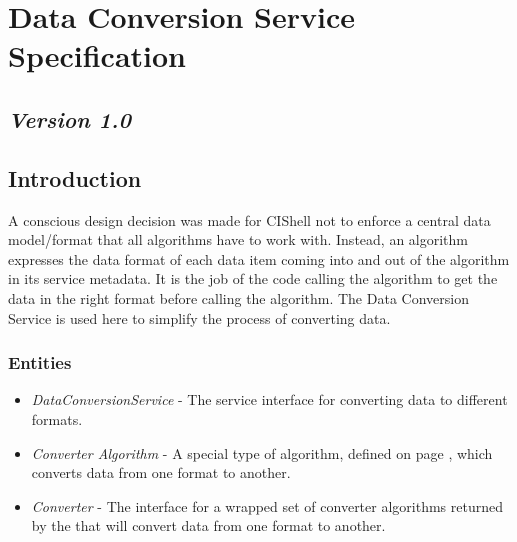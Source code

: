 %

\chapter{Data Conversion Service Specification}
\section*{\textit{Version 1.0}}
\section{Introduction}

A conscious design decision was made for CIShell not to enforce a central data
model/format that all algorithms have to work with. Instead, an algorithm
expresses the data format of each data item coming into and out of the algorithm
in its service metadata. It is the job of the code calling the algorithm to get
the data in the right format before calling the algorithm. The Data Conversion
Service is used here to simplify the process of converting data.

\subsection{Entities}

\begin{itemize}
  \item \textit{DataConversionService} - The service interface for converting
  data to different formats.
  \item \textit{Converter Algorithm} - A special type of algorithm, defined
  on page \pageref{converterAlg}, which converts data from one format to
  another.
  \item \textit{Converter} - The interface for a wrapped set of converter
  algorithms returned by the  that will convert
  data from one format to another.
\end{itemize}

